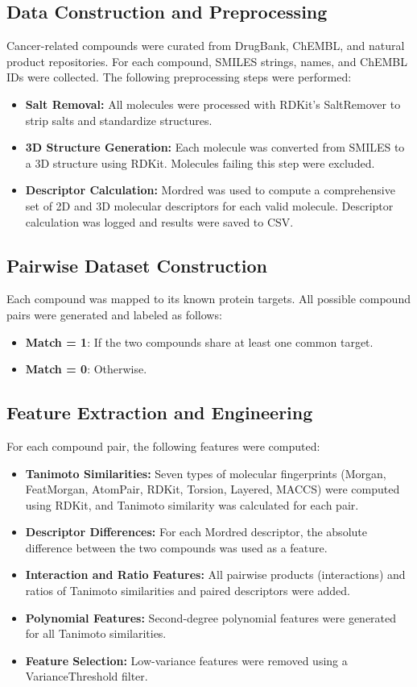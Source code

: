 \documentclass[11pt,a4paper]{article}
\begin{document}
\subsection{Data Construction and Preprocessing}
Cancer-related compounds were curated from DrugBank, ChEMBL, and natural product repositories. For each compound, SMILES strings, names, and ChEMBL IDs were collected. The following preprocessing steps were performed:
\begin{itemize}
    \item \textbf{Salt Removal:} All molecules were processed with RDKit's SaltRemover to strip salts and standardize structures.
    \item \textbf{3D Structure Generation:} Each molecule was converted from SMILES to a 3D structure using RDKit. Molecules failing this step were excluded.
    \item \textbf{Descriptor Calculation:} Mordred was used to compute a comprehensive set of 2D and 3D molecular descriptors for each valid molecule. Descriptor calculation was logged and results were saved to CSV.
\end{itemize}

\subsection{Pairwise Dataset Construction}
Each compound was mapped to its known protein targets. All possible compound pairs were generated and labeled as follows:
\begin{itemize}
    \item \textbf{Match = 1}: If the two compounds share at least one common target.
    \item \textbf{Match = 0}: Otherwise.
\end{itemize}

\subsection{Feature Extraction and Engineering}
For each compound pair, the following features were computed:
\begin{itemize}
    \item \textbf{Tanimoto Similarities:} Seven types of molecular fingerprints (Morgan, FeatMorgan, AtomPair, RDKit, Torsion, Layered, MACCS) were computed using RDKit, and Tanimoto similarity was calculated for each pair.
    \item \textbf{Descriptor Differences:} For each Mordred descriptor, the absolute difference between the two compounds was used as a feature.
    \item \textbf{Interaction and Ratio Features:} All pairwise products (interactions) and ratios of Tanimoto similarities and paired descriptors were added.
    \item \textbf{Polynomial Features:} Second-degree polynomial features were generated for all Tanimoto similarities.
    \item \textbf{Feature Selection:} Low-variance features were removed using a VarianceThreshold filter.
\end{itemize}
\end{document}
